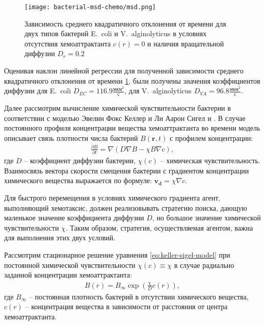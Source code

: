 \begin{figure}[ht]
    \centering
    \texttt{[image: bacterial-msd-chemo/msd.png]}
    \caption{
        Зависимость среднего квадратичного отклонения от времени для двух типов бактерий E.~coli и V.~alginolyticus в условиях отсутствия хемоаттрактанта $c(r)=0$ и наличия вращательной диффузии $D_r=0.2$
    }
    \label{fig:msd-bacteria}
\end{figure}

Оценивая наклон линейной регрессии для полученной зависимости среднего квадратичного отклонения от времени \cref{fig:msd-bacteria}, были получены значения коэффициентов диффузии для E.~coli $D_{EC}=116.9 \frac{\textrm{мкм}^2}{\textrm{с}}$, для V.~alginolyticus $D_{VA}=96.8 \frac{\textrm{мкм}^2}{\textrm{с}}$.

Далее рассмотрим вычисление химической чувствительности бактерии в соответствии с моделью Эвелин Фокс Келлер и Ли Аарон Сигел и \cite{keller_model_1971}. В случае постоянного профиля концентрации вещества хемоаттрактанта во времени модель описывает связь плотности числа бактерий $B(\textbf{r}, t)$ с профилем концентрации:
\begin{equation}
    \begin{aligned}
        \frac{\partial B}{\partial t}=\nabla (D \nabla B - \chi B \nabla c),
    \label{eq:keller-sigel-model}
    \end{aligned}
\end{equation}
где $D$ -- коэффициент диффузии бактерии, $\chi (c)$ -- химическая чувствительность. Взаимосвязь вектора скорости смещения бактерии с градиентом концентрации химического вещества выражается по формуле: 
$\boldsymbol{v_d}=\chi \nabla c$. 

Для быстрого перемещения в условиях химического градиента агент, выполняющий хемотаксис, должен реализовывать стратегию поиска, дающую маленькое значение коэффициента диффузии $D$, но большое значение химической чувствительности $\chi$. Таким образом, стратегия, осуществляемая агентом, важна для выполнения этих двух условий.

Рассмотрим стационарное решение уравнения \cref{eq:keller-sigel-model} при постоянной химической чувствительности $\chi(c) \equiv \chi$ в случае радиально заданной концентрации хемоаттрактанта:
\begin{equation}
    \begin{aligned}
        B(r) = B_{\infty} \exp \left ( \frac{\chi}{D}c(r) \right ),
    \label{eq:keller-sigel-stationary-solution}
    \end{aligned}
\end{equation}
где $B_{\infty}$ -- постоянная плотность бактерий в отсутствии химического вещества, $c(r)$ -- концентрация вещества в зависимости от расстояния от центра хемоаттрактанта.

